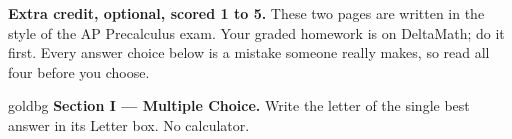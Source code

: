 \documentclass[10pt]{article}
\begin{document}

\vspace{0.12in}

\boxguard[8]
\begin{remindbox}
\small
\textbf{Extra credit, optional, scored 1 to 5.} These two pages are written in the style of the AP
Precalculus exam. Your graded homework is on DeltaMath; do it first. Every
answer choice below is a mistake someone really makes, so read all four before you choose.
\end{remindbox}

\vspace{0.12in}

\begin{headlinebox}{goldbg}
\small
\textbf{Section I --- Multiple Choice.} Write the letter of the single best answer in its Letter box. No calculator.
\end{headlinebox}

\vspace{0.06in}
\end{document}
